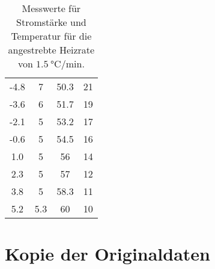 \begin{table}[h]
\begin{tabular}{S[table-format=3.1] S[table-format=2.10] S[table-format=2.1] S[table-format=2.1]}
    -4.8  & 7   & 50.3  & 21  \\
    -3.6  & 6   & 51.7  & 19  \\
    -2.1  & 5   & 53.2  & 17  \\
    -0.6  & 5   & 54.5  & 16  \\
    1.0   & 5   & 56    & 14  \\
    2.3   & 5   & 57    & 12  \\
    3.8   & 5   & 58.3  & 11  \\
    5.2   & 5.3 & 60    & 10  \\
    \bottomrule
  \end{tabular}
  \caption{Messwerte für Stromstärke und Temperatur für die angestrebte Heizrate von $\SI{1.5}{\celsius\per\minute}$.}
  \label{tab:mess2}
\end{table}

\section{Kopie der Originaldaten}
